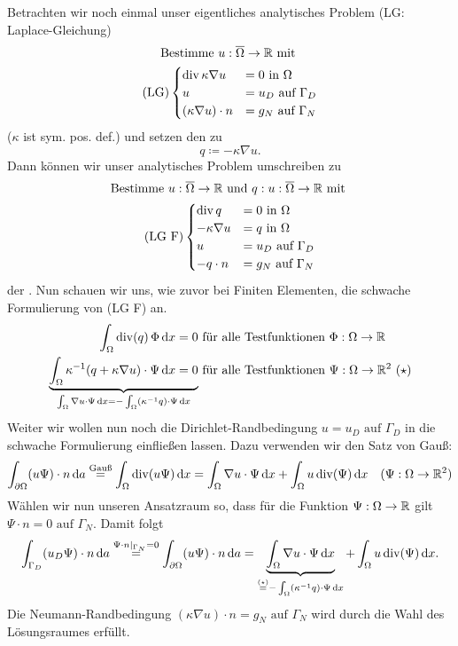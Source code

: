 Betrachten wir noch einmal unser eigentliches analytisches Problem (LG: Laplace-Gleichung) 
\begin{gather*}
 \text{Bestimme } u:\overline{\Omega} \to \mathbb{R} \text{ mit }\\	
	\text{(LG)}\begin{cases}
	\operatorname{div} \kappa \nabla u &= 0 \text{ in } \Omega\\
	u &= u_D \text{ auf } \Gamma_D \\
	(\kappa\nabla u) \cdot n &= g_N \text{ auf } \Gamma_N \\
	\end{cases}
\end{gather*}
($ \kappa $ ist sym. pos. def.) und setzen den  zu 
\[ q \coloneqq - \kappa \nabla u. \]
Dann können wir unser analytisches Problem umschreiben zu 
\begin{gather*}
	\text{Bestimme } u:\overline{\Omega} \to \mathbb{R} \text{ und } q: u:\overline{\Omega} \to \mathbb{R} \text{ mit } \\
		\text{(LG F)}\begin{cases}
		\operatorname{div} q &= 0 \text{ in } \Omega\\
		- \kappa \nabla u &= q \text{ in } \Omega\\
		u &= u_D \text{ auf } \Gamma_D \\
		-q \cdot n &= g_N \text{ auf } \Gamma_N \\
		\end{cases}
\end{gather*} 
der . Nun schauen wir uns, wie zuvor bei Finiten Elementen, die schwache Formulierung von (LG F) an.
\begin{align*}
	\int_\Omega \operatorname{div}(q)\, \Phi \mathop{}\!\mathrm{d} x = 0 &\text{ für alle Testfunktionen } \Phi: \Omega \to \mathbb{R} \\
	\underbrace{\int_{\Omega} \kappa^{-1} (q + \kappa \nabla u) \cdot \Psi \mathop{}\!\mathrm{d} x = 0}_{\int_{\Omega} \nabla u \cdot \Psi \mathop{}\!\mathrm{d} x = - \int_{\Omega} (\kappa^{-1} q) \cdot \Psi \mathop{}\!\mathrm{d} x}  &\text{ für alle Testfunktionen } \Psi:\Omega \to \mathbb{R}^2 \ (\star)
\end{align*}
Weiter wir wollen nun noch die Dirichlet-Randbedingung $ 	u = u_D \text{ auf } \Gamma_D $ in die schwache Formulierung einfließen lassen. Dazu verwenden wir den Satz von Gauß:
\[ \int_{\partial\Omega} (u\Psi) \cdot n \mathop{}\!\mathrm{d} a \stackrel{\text{Gauß}}{=} \int_{\Omega} \operatorname{div}(u\Psi) \mathop{}\!\mathrm{d} x = \int_{\Omega} \nabla u \cdot \Psi \mathop{}\!\mathrm{d} x + \int_{\Omega} u \operatorname{div}(\Psi) \mathop{}\!\mathrm{d} x \quad (\Psi:\Omega \to \mathbb{R}^2) \]
Wählen wir nun unseren Ansatzraum so, dass  für die Funktion $ \Psi: \Omega \to \mathbb{R}$ gilt $ \Psi \cdot n = 0 \text{ auf } \Gamma_N $. Damit folgt
\begin{align*}
	\int_{\Gamma_D} (u_D\Psi) \cdot n \mathop{}\!\mathrm{d} a \stackrel{\Psi \cdot n|_{\Gamma_N} = 0}{=} \int_{\partial\Omega} (u\Psi) \cdot n \mathop{}\!\mathrm{d} a = \underbrace{\int_{\Omega} \nabla u \cdot \Psi \mathop{}\!\mathrm{d} x}_{\stackrel{(\star)}{=}- \int_{\Omega} (\kappa^{-1} q) \cdot \Psi \mathop{}\!\mathrm{d} x } + \int_{\Omega} u \operatorname{div}(\Psi) \mathop{}\!\mathrm{d} x.
\end{align*}
Die Neumann-Randbedingung $ (\kappa\nabla u) \cdot n = g_N \text{ auf } \Gamma_N $ wird durch die Wahl des Lösungsraumes erfüllt.


